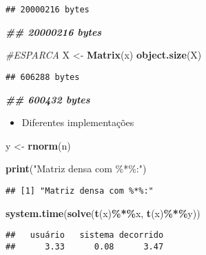 \documentclass[
]{article}
\newenvironment{Shaded}{\begin{snugshade}}{\end{snugshade}}
\newcommand{\CommentTok}[1]{\textcolor[rgb]{0.56,0.35,0.01}{\textit{#1}}}
\newcommand{\DocumentationTok}[1]{\textcolor[rgb]{0.56,0.35,0.01}{\textbf{\textit{#1}}}}
\newcommand{\FunctionTok}[1]{\textcolor[rgb]{0.13,0.29,0.53}{\textbf{#1}}}
\newcommand{\NormalTok}[1]{#1}
\newcommand{\OtherTok}[1]{\textcolor[rgb]{0.56,0.35,0.01}{#1}}
\newcommand{\SpecialCharTok}[1]{\textcolor[rgb]{0.81,0.36,0.00}{\textbf{#1}}}
\newcommand{\StringTok}[1]{\textcolor[rgb]{0.31,0.60,0.02}{#1}}
\providecommand{\tightlist}{%
  \setlength{\itemsep}{0pt}\setlength{\parskip}{0pt}}
\begin{document}
\begin{verbatim}
## 20000216 bytes
\end{verbatim}

\begin{Shaded}
\begin{Highlighting}[]
\DocumentationTok{\#\# 20000216 bytes}

\CommentTok{\#ESPARCA}
\NormalTok{X }\OtherTok{\textless{}{-}} \FunctionTok{Matrix}\NormalTok{(x)}
\FunctionTok{object.size}\NormalTok{(X)}
\end{Highlighting}
\end{Shaded}

\begin{verbatim}
## 606288 bytes
\end{verbatim}

\begin{Shaded}
\begin{Highlighting}[]
\DocumentationTok{\#\# 600432 bytes}
\end{Highlighting}
\end{Shaded}

\begin{itemize}
\tightlist
\item
  Diferentes implementações
\end{itemize}

\begin{Shaded}
\begin{Highlighting}[]
\NormalTok{y }\OtherTok{\textless{}{-}} \FunctionTok{rnorm}\NormalTok{(n)}

\FunctionTok{print}\NormalTok{(}\StringTok{"Matriz densa com \%*\%:"}\NormalTok{)}
\end{Highlighting}
\end{Shaded}

\begin{verbatim}
## [1] "Matriz densa com %*%:"
\end{verbatim}

\begin{Shaded}
\begin{Highlighting}[]
\FunctionTok{system.time}\NormalTok{(}\FunctionTok{solve}\NormalTok{(}\FunctionTok{t}\NormalTok{(x)}\SpecialCharTok{\%*\%}\NormalTok{x, }\FunctionTok{t}\NormalTok{(x)}\SpecialCharTok{\%*\%}\NormalTok{y))}
\end{Highlighting}
\end{Shaded}

\begin{verbatim}
##   usuário   sistema decorrido 
##      3.33      0.08      3.47
\end{verbatim}
\end{document}
